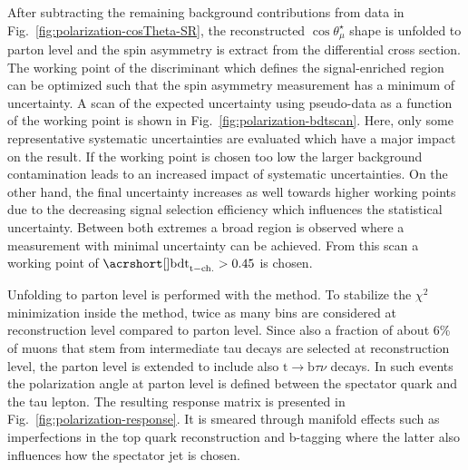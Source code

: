 After subtracting the remaining background contributions from data in Fig.~\ref{fig:polarization-cosTheta-SR}, the reconstructed $\cos\theta_{\mu}^\star$ shape is unfolded to parton level and the spin asymmetry is extract from the differential cross section. The working point of the \bdttch discriminant which defines the signal-enriched region can be optimized such that the spin asymmetry measurement has a minimum of uncertainty. A scan of the expected uncertainty using pseudo-data as a function of the working point is shown in Fig.~\ref{fig:polarization-bdtscan}. Here, only some representative systematic uncertainties are evaluated which have a major impact on the result. If the working point is chosen too low the larger background contamination leads to an increased impact of systematic uncertainties. On the other hand, the final uncertainty increases as well towards higher working points due to the decreasing signal selection efficiency which influences the statistical uncertainty. Between both extremes a broad region is observed where a measurement with minimal uncertainty can be achieved. From this scan a working point of $\bdttch>0.45$ is chosen. 


Unfolding to parton level is performed with the \TUNFOLD method. To stabilize the $\chi^2$ minimization inside the method, twice as many bins are considered at reconstruction level compared to parton level. Since also a fraction of about 6\% of muons that stem from intermediate tau decays are selected at reconstruction level, the parton level is extended to include also $\mathrm{t}\to\mathrm{b}\tau\nu$ decays. In such events the polarization angle at parton level is defined between the spectator quark and the tau lepton. The resulting response matrix is presented in Fig.~\ref{fig:polarization-response}. It is smeared through manifold effects such as imperfections in the top quark reconstruction and b-tagging where the latter also influences how the spectator jet is chosen. 
 

